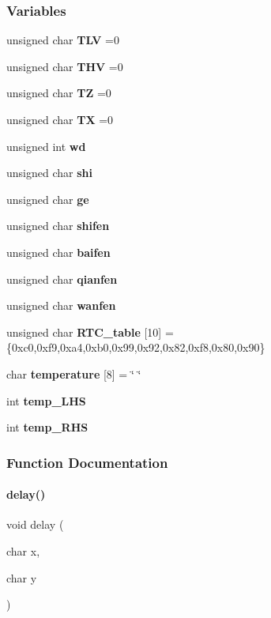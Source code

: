\subsubsection*{Variables}
\begin{DoxyCompactItemize}
\item 
unsigned char \textbf{ T\+LV} =0
\item 
unsigned char \textbf{ T\+HV} =0
\item 
unsigned char \textbf{ TZ} =0
\item 
unsigned char \textbf{ TX} =0
\item 
unsigned int \textbf{ wd}
\item 
unsigned char \textbf{ shi}
\item 
unsigned char \textbf{ ge}
\item 
unsigned char \textbf{ shifen}
\item 
unsigned char \textbf{ baifen}
\item 
unsigned char \textbf{ qianfen}
\item 
unsigned char \textbf{ wanfen}
\item 
unsigned char \textbf{ R\+T\+C\+\_\+table} [10] =\{0xc0,0xf9,0xa4,0xb0,0x99,0x92,0x82,0xf8,0x80,0x90\}
\item 
char \textbf{ temperature} [8] = \char`\"{} \char`\"{}
\item 
int \textbf{ temp\+\_\+\+L\+HS}
\item 
int \textbf{ temp\+\_\+\+R\+HS}
\end{DoxyCompactItemize}


\subsubsection{Function Documentation}
\mbox{\label{a00047_a0bdd09d004d02b67ac952b8da05e8115}} 
\paragraph{delay()}
{\footnotesize\ttfamily void delay (\begin{DoxyParamCaption}\item[{char}]{x,  }\item[{char}]{y }\end{DoxyParamCaption})}

